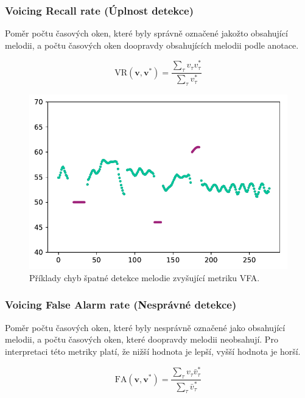 \subsubsection{Voicing Recall rate (Úplnost detekce)}

Poměr počtu časových oken, které byly správně označené jakožto obsahující melodii, a počtu časových oken doopravdy obsahujících melodii podle anotace.

    $$\mathrm{VR}(\mathbf{v}, \mathbf{v^*}) = \frac{\sum_\tau{v_\tau v^*_\tau}}{\sum_\tau{v^*_\tau}}$$

\begin{figure}[h!]\centering
\includegraphics[scale=0.5]{../img/chyba_VFA}
\caption{Příklady chyb špatné detekce melodie zvyšující metriku VFA.}
\label{obr:chyba_VFA}
\end{figure}

\subsubsection{Voicing False Alarm rate (Nesprávné detekce)}

Poměr počtu časových oken, které byly nesprávně označené jako obsahující melodii, a počtu časových oken, které doopravdy melodii neobsahují. Pro interpretaci této metriky platí, že nižší hodnota je lepší, vyšší hodnota je horší.

    $$\mathrm{FA}(\mathbf{v}, \mathbf{v^*}) = \frac{\sum_\tau{v_\tau \bar{v}^*_\tau}}{\sum_\tau{\bar{v}^*_\tau}}$$


